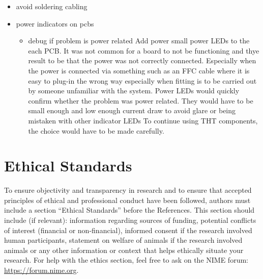 \begin{itemize}
\item
  avoid soldering cabling
\item
  power indicators on pcbs

  \begin{itemize}
  \item
    debug if problem is power related Add power small power LEDs to the
    each PCB. It was not common for a board to not be functioning and
    thye result to be that the power was not correctly connected.
    Especially when the power is connected via something such as an FFC
    cable where it is easy to plug-in the wrong way especially when
    fitting is to be carried out by someone unfamiliar with the system.
    Power LEDs would quickly confirm whether the problem was power
    related. They would have to be small enough and low enough current
    draw to avoid glare or being mistaken with other indicator LEDs To
    continue using THT components, the choice would have to be made
    carefully.
  \end{itemize}
\end{itemize}

\section{Ethical Standards}\label{ethical-standards}

To ensure objectivity and transparency in research and to ensure that
accepted principles of ethical and professional conduct have been
followed, authors must include a section ``Ethical Standards'' before
the References. This section should include (if relevant): information
regarding sources of funding, potential conflicts of interest (financial
or non-financial), informed consent if the research involved human
participants, statement on welfare of animals if the research involved
animals or any other information or context that helps ethically situate
your research. For help with the ethics section, feel free to ask on the
NIME forum: \url{https://forum.nime.org}.
